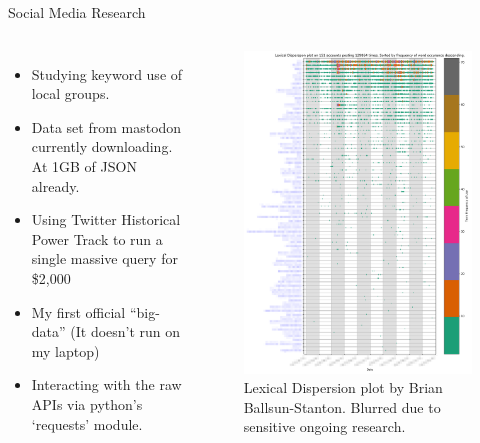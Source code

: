 \documentclass[aspectratio=1610, 11pt]{beamer} %
\begin{document}
\begin{frame}{Social Media Research}
\begin{columns}
\begin{itemize}[label=\textbullet]
    \item Studying keyword use of local groups.
    \item Data set from mastodon currently downloading. At 1GB of JSON already. 
    \item Using Twitter Historical Power Track to run a single massive query for \$2,000
    \item My first official ``big-data'' (It doesn't run on my laptop)
    \item Interacting with the raw APIs via python's `requests' module.

\end{itemize}
\begin{figure}
    \includegraphics[height=.7\textheight]{figures/blur.png}
    \caption{Lexical Dispersion plot by Brian Ballsun-Stanton. Blurred due to sensitive ongoing research.}
    \label{fig:blur}
\end{figure}
\end{columns}

\end{frame}
\end{document}
